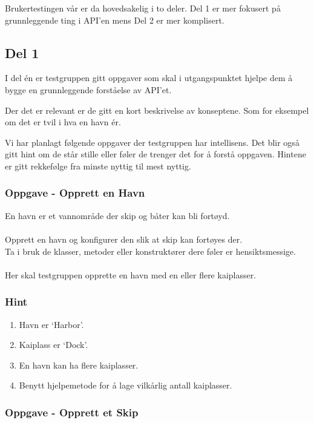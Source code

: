 \documentclass[12pt]{article}
\begin{document}
Brukertestingen vår er da hovedsakelig i to deler. Del 1 er mer fokusert på grunnleggende ting i API'en mens Del 2 er mer komplisert.

\subsection{Del 1} 

I del én er testgruppen gitt oppgaver som skal i utgangspunktet hjelpe dem å bygge en grunnleggende forståelse av API'et. 

Der det er relevant er de gitt en kort beskrivelse av konseptene. Som for eksempel om det er tvil i hva en havn ér.

Vi har planlagt følgende oppgaver der testgruppen har intellisens.
Det blir også gitt hint om de står stille eller føler de trenger det for å forstå oppgaven. Hintene er gitt rekkefølge fra minste nyttig til mest nyttig.

\subsubsection{Oppgave - Opprett en Havn}

En havn er et vannområde der skip og båter kan bli fortøyd. \\ \\
Opprett en havn og konfigurer den slik at skip kan fortøyes der. \\
Ta i bruk de klasser, metoder eller konstruktører dere føler er hensiktsmessige. \\ \\
Her skal testgruppen opprette en havn med en eller flere kaiplasser.

\subsubsection*{Hint}

\begin{enumerate}
    \item Havn er `Harbor'.
    \item Kaiplass er `Dock'.
    \item En havn kan ha flere kaiplasser.
    \item Benytt hjelpemetode for å lage vilkårlig antall kaiplasser.
\end{enumerate}

\subsubsection{Oppgave - Opprett et Skip}
\end{document}
